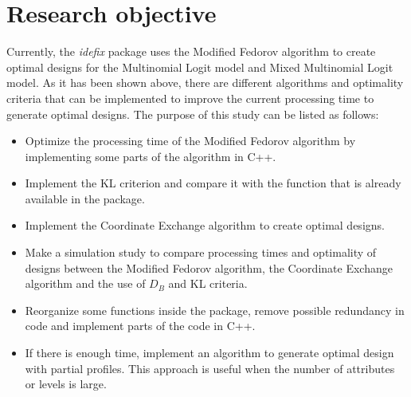 \documentclass[12pt,a4paper,oneside]{article}
\begin{document}

\section{Research objective}
Currently, the \textit{idefix} package uses the Modified Fedorov algorithm to create optimal designs for the Multinomial Logit model and Mixed Multinomial Logit model. As it has been shown above, there are different algorithms and optimality criteria that can be implemented to improve the current processing time to generate optimal designs. The purpose of this study can be listed as follows: 
\begin{itemize}
    \item Optimize the processing time of the Modified Fedorov algorithm by implementing some parts of the algorithm in C++.
    \item Implement the KL criterion and compare it with the function that is already available in the package.
    \item Implement the Coordinate Exchange algorithm to create optimal designs.
    \item Make a simulation study to compare processing times and optimality of designs between the Modified Fedorov algorithm, the Coordinate Exchange algorithm and the use of $D_B$ and KL criteria.
    \item Reorganize some functions inside the package, remove possible redundancy in code and implement parts of the code in C++.
    \item If there is enough time, implement an algorithm to generate optimal design with partial profiles. This approach is useful when the number of attributes or levels is large.
\end{itemize}



\end{document}
